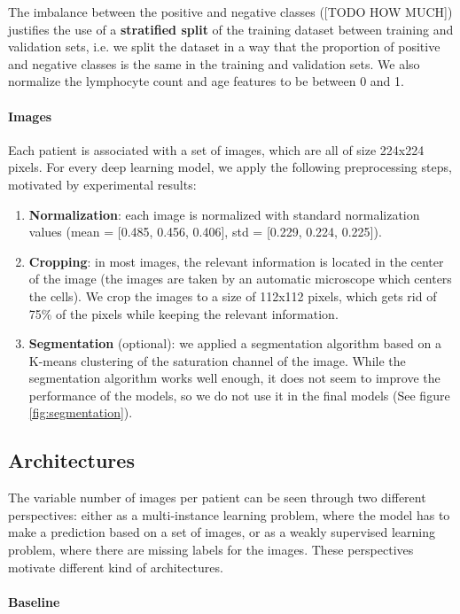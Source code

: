\documentclass{midl}
\begin{document}
The imbalance between the positive and negative classes ([TODO HOW MUCH]) justifies the use of a \textbf{stratified split} of the training dataset between training and validation sets, i.e. we split the dataset in a way that the proportion of positive and negative classes is the same in the training and validation sets. We also normalize the lymphocyte count and age features to be between 0 and 1.

\paragraph*{Images}
Each patient is associated with a set of images, which are all of size 224x224 pixels. For every deep learning model, we apply the following preprocessing steps, motivated by experimental results:
\begin{enumerate}
    \setlength\itemsep{0em}
    \item \textbf{Normalization}: each image is normalized with standard normalization values (mean = [0.485, 0.456, 0.406], std = [0.229, 0.224, 0.225]).
    \item \textbf{Cropping}: in most images, the relevant information is located in the center of the image (the images are taken by an automatic microscope which centers the cells). We crop the images to a size of 112x112 pixels, which gets rid of 75\% of the pixels while keeping the relevant information.
    \item \textbf{Segmentation} (optional): we applied a segmentation algorithm based on a K-means clustering of the saturation channel of the image. While the segmentation algorithm works well enough, it does not seem to improve the performance of the models, so we do not use it in the final models (See figure \ref{fig:segmentation}).
\end{enumerate}

\subsection{Architectures}

The variable number of images per patient can be seen through two different perspectives: either as a multi-instance learning problem, where the model has to make a prediction based on a set of images, or as a weakly supervised learning problem, where there are missing labels for the images. These perspectives motivate different kind of architectures.

\paragraph*{Baseline}
\end{document}

